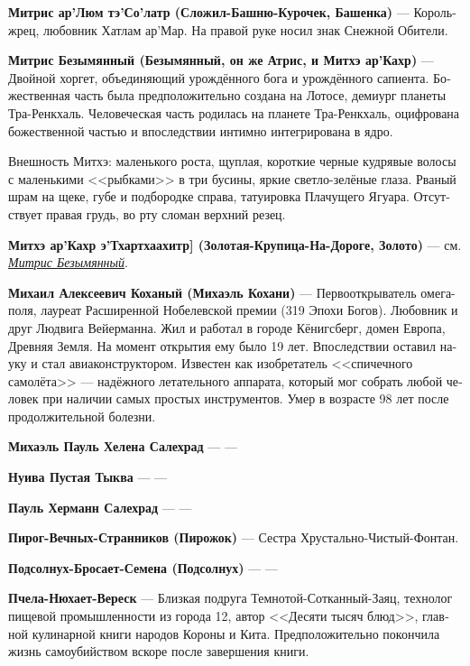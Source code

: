 \documentclass[a4paper,12pt,fleqn]{book}\usepackage{polyglossia}\setdefaultlanguage[babelshorthands=true]{russian}\setotherlanguage{english}\defaultfontfeatures{Ligatures=TeX,Mapping=tex-text}\usepackage{xcolor}\newcommand{\ml}[3]{#2}
\newcommand{\theterm}[3]{\textbf{\hypertarget{#1}{#2}} --- #3}
\newcommand{\thesynonim}[3]{\textbf{#2} --- см. \textit{\hyperlink{#1}{#3}}.}
\begin{document}
{\theterm{king-priest-mitris}
{Митрис ар’Люм тэ’Со'латр (Сложил-Башню-Курочек, Башенка)}
{Король-жрец, любовник Хатлам ар'Мар.
На правой руке носил знак Снежной Обители.}

\theterm{nameless} %
{Митрис Безымянный (Безымянный, он же Атрис, и Митхэ ар'Кахр)}
{Двойной хоргет, объединяющий урождённого бога и урождённого сапиента.
Божественная часть была предположительно создана на Лотосе, демиург планеты Тра-Ренкхаль.
Человеческая часть родилась на планете Тра-Ренкхаль, оцифрована божественной частью и впоследствии интимно интегрирована в ядро.

Внешность Митхэ: маленького роста, щуплая, короткие черные кудрявые волосы с маленькими <<рыбками>> в три бусины, яркие светло-зелёные глаза.
Рваный шрам на щеке, губе и подбородке справа, татуировка Плачущего Ягуара.
Отсутствует правая грудь, во рту сломан верхний резец.}

\thesynonim{nameless}
{Митхэ ар’Кахр э’Тхартхаахитр] (Золотая-Крупица-На-Дороге, Золото)}
{Митрис Безымянный}

\theterm{kojani}
{Михаил Алексеевич Коханый (Михаэль Кохани)}
{Первооткрыватель омега-поля, лауреат Расширенной Нобелевской премии (319 Эпохи Богов).
Любовник и друг Людвига Вейерманна.
Жил и работал в городе Кёнигсберг, домен Европа, Древняя Земля.
На момент открытия ему было 19 лет.
Впоследствии оставил науку и стал авиаконструктором.
Известен как изобретатель <<спичечного самолёта>> --- надёжного летательного аппарата, который мог собрать любой человек при наличии самых простых инструментов.
Умер в возрасте 98 лет после продолжительной болезни.}

\theterm{michael}
{Михаэль Пауль Хелена Салехрад}
{---}

\theterm{nuuwa} %
{Нуива Пустая Тыква}
{---}

\theterm{paul}
{Пауль Херманн Салехрад}
{---}

\theterm{cupcake}
{Пирог-Вечных-Странников (Пирожок)}
{Сестра Хрустально-Чистый-Фонтан.}

\theterm{sunflower} %
{Подсолнух-Бросает-Семена (Подсолнух)}
{---}

\theterm{heather} %
{Пчела-Нюхает-Вереск}
{Близкая подруга Темнотой-Сотканный-Заяц, технолог пищевой промышленности из города 12, автор <<Десяти тысяч блюд>>, главной кулинарной книги народов Короны и Кита.
Предположительно покончила жизнь самоубийством вскоре после завершения книги.}

}
\end{document}
